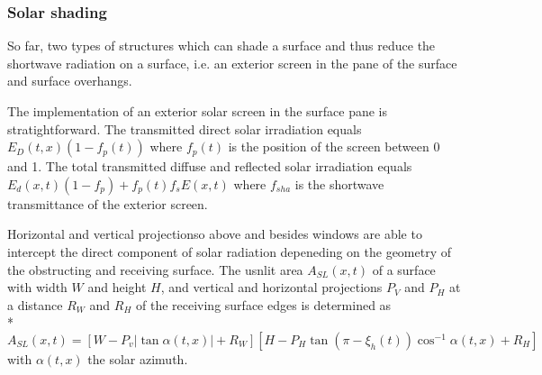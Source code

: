 \subsubsection{Solar shading}

So far, two types of structures which can shade a surface and thus reduce the shortwave radiation on a surface, i.e. an exterior screen in the pane of the surface and surface overhangs.

The implementation of an exterior solar screen in the surface pane is stratightforward. The transmitted direct solar irradiation equals $E_{D}(t,x) \left(1 - f_{p}(t)\right)$ where $f_{p}(t)$ is the position of the screen between 0 and 1. The total transmitted diffuse and reflected solar irradiation equals $E_{d}(x,t) \left(1 - f_{p}\right) +f_{p}(t)  f_{s} E(x,t)$ where $f_{sha}$ is the shortwave transmittance of the exterior screen.

Horizontal and vertical projectionso above and besides windows are able to intercept the direct component of solar radiation depeneding on the geometry of the obstructing and receiving surface. The usnlit area $A_{SL}(x,t)$ of a surface with width $W$ and height $H$, and vertical and horizontal projections $P_{V}$ and $P_{H}$ at a distance $R_{W}$ and $R_{H}$ of the receiving surface edges is determined as  \\*
\begin{equation}
A_{SL}(x,t) = \left[W - P_{v}  \left|\tan \alpha(t,x) \right| + R_{W}\right] \left[H - P_{H} \tan \left(\pi - \xi_{h}(t)\right) \cos^{-1} \alpha(t,x) + R_{H}\right]
\end{equation}
with $\alpha(t,x)$ the solar azimuth.











